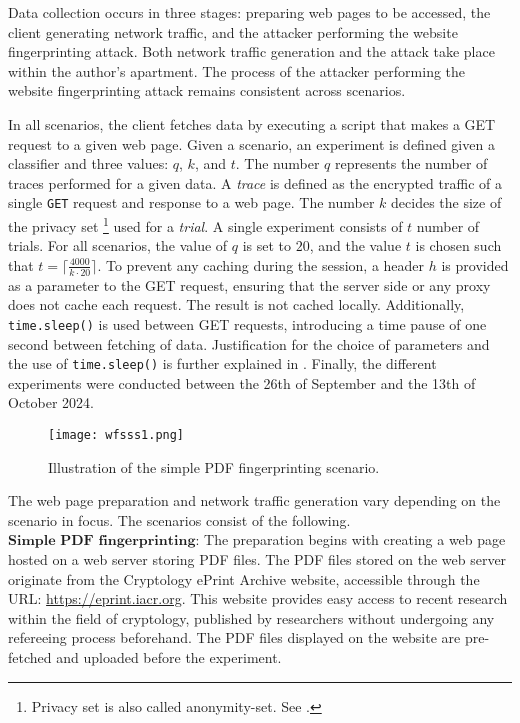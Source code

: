 Data collection occurs in three stages: preparing web pages to be accessed, the client generating network traffic, and the attacker performing the website fingerprinting attack. Both network traffic generation and the attack take place within the author's apartment. The process of the attacker performing the website fingerprinting attack remains consistent across scenarios.

In all scenarios, the client fetches data by executing a script that makes a GET request to a given web page. Given a scenario, an experiment is defined given a classifier and three values: $q$, $k$, and $t$. The number $q$ represents the number of traces performed for a given data. A \textit{trace} is defined as the encrypted traffic of a single \texttt{GET} request and response to a web page. The number $k$ decides the size of the privacy set \footnote{Privacy set is also called anonymity-set. See \cite{wang2014effective}.} used for a \textit{trial}. A single experiment consists of $t$ number of trials. For all scenarios, the value of $q$ is set to $20$, and the value $t$ is chosen such that $t = \lceil \tfrac{4000}{k \cdot 20} \rceil$. To prevent any caching during the session, a header $h$ is provided as a parameter to the GET request, ensuring that the server side or any proxy does not cache each request. The result is not cached locally. Additionally, \texttt{time.sleep()} is used between GET requests, introducing a time pause of one second between fetching of data. Justification for the choice of parameters and the use of \texttt{time.sleep()} is further explained in . Finally, the different experiments were conducted between the 26th of September and the 13th of October 2024. \\

\begin{figure}
	\centering
        \texttt{[image: wfsss1.png]}
         \caption{Illustration of the simple PDF fingerprinting scenario.}
    \label{fig:wfsss1}
\end{figure}

The web page preparation and network traffic generation vary depending on the scenario in focus. The scenarios consist of the following.\\

$\textbf{Simple PDF fingerprinting}$: The preparation begins with creating a web page hosted on a web server storing PDF files. The PDF files stored on the web server originate from the Cryptology ePrint Archive website, accessible through the URL: \url{https://eprint.iacr.org}. This website provides easy access to recent research within the field of cryptology, published by researchers without undergoing any refereeing process beforehand. The PDF files displayed on the website are pre-fetched and uploaded before the experiment.

